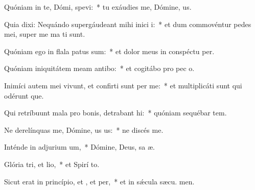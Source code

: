 \item Quóniam in te, Dómi, spevi:~* tu exáudies me, Dómine,  us.
\item Quia dixi: Nequándo supergáudeant mihi inici i:~* et dum commovéntur pedes mei, super me ma ti sunt.
\item Quóniam ego in flala patus sum:~* et dolor meus in conspéctu  per.
\item Quóniam iniquitátem meam antibo:~* et cogitábo pro pec o.
\item Inimíci autem mei vivunt, et confirti sunt per me:~* et multiplicáti sunt qui odérunt  que.
\item Qui retríbuunt mala pro bonis, detrabant hi:~* quóniam sequébar tem.
\item Ne derelínquas me, Dómine, us us:~* ne discés  me.
\item Inténde in adjurium um,~* Dómine, Deus, sa æ.
\item Glória tri, et lio,~* et Spirí to.
\item Sicut erat in princípio, et , et per,~* et in sǽcula sæcu. men.
